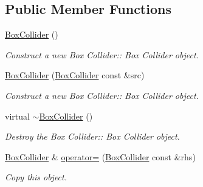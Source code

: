 \subsection*{Public Member Functions}
\begin{DoxyCompactItemize}
\item 
\mbox{\label{class_box_collider_aa8358aaf4f5fae5446ebdf0b303ccce3}} 
\hyperlink{class_box_collider_aa8358aaf4f5fae5446ebdf0b303ccce3}{Box\+Collider} ()
\begin{DoxyCompactList}\small\item\em Construct a new Box Collider\+:\+: Box Collider object. \end{DoxyCompactList}\item 
\hyperlink{class_box_collider_a79511f75725470715ff72c4b4622de21}{Box\+Collider} (\hyperlink{class_box_collider}{Box\+Collider} const \&src)
\begin{DoxyCompactList}\small\item\em Construct a new Box Collider\+:\+: Box Collider object. \end{DoxyCompactList}\item 
\mbox{\label{class_box_collider_a8c33dbb4325d76d441de38b7c4ae43af}} 
virtual \hyperlink{class_box_collider_a8c33dbb4325d76d441de38b7c4ae43af}{$\sim$\+Box\+Collider} ()
\begin{DoxyCompactList}\small\item\em Destroy the Box Collider\+:\+: Box Collider object. \end{DoxyCompactList}\item 
\hyperlink{class_box_collider}{Box\+Collider} \& \hyperlink{class_box_collider_a785e2defc2d9deab26589149262ff114}{operator=} (\hyperlink{class_box_collider}{Box\+Collider} const \&rhs)
\begin{DoxyCompactList}\small\item\em Copy this object. \end{DoxyCompactList}\end{DoxyCompactItemize}
